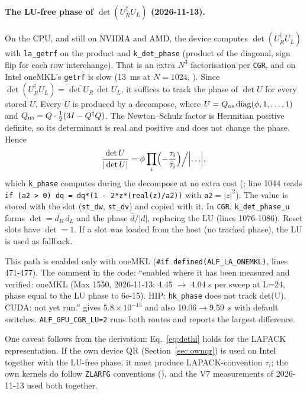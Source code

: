 \paragraph{The LU-free phase of $\det(U_R^\dagger U_L)$ (2026-11-13).} On the CPU, and still on NVIDIA and AMD, the device computes $\det(U_R^\dagger U_L)$ with \texttt{la\_getrf} on the product and \texttt{k\_det\_phase} (product of the diagonal, sign flip for each row interchange). That is an extra $N^3$ factorisation per \texttt{CGR}, and on Intel oneMKL's \texttt{getrf} is slow (13~ms at $N=1024$, ). %
Since $\det(U_R^\dagger U_L)=\overline{\det U_R}\,\det U_L$, it suffices to track the phase of $\det U$ for every stored $U$. Every $U$ is produced by a decompose, where $U = Q_{\rm ns}\,\mathrm{diag}(\phi,1,\ldots,1)$ and $Q_{\rm ns}=Q\cdot\tfrac12(3I-Q^\dagger Q)$. The Newton--Schulz factor is Hermitian positive definite, so its determinant is real and positive and does not change the phase. Hence
\begin{equation}
\frac{\det U}{|\det U|} = \phi\prod_i\Bigl(-\frac{\tau_i}{\bar\tau_i}\Bigr)\Big/\Bigl|\ldots\Bigr|,
\end{equation}
which \texttt{k\_phase} computes during the decompose at no extra cost (; line 1044 reads \texttt{if (a2 > 0) dq = dq*(1 - 2*z*(real(z)/a2))} with \texttt{a2}$=|z|^2$). The value is stored with the slot (\texttt{st\_dw}, \texttt{st\_dv}) and copied with it. In \texttt{CGR}, \texttt{k\_det\_phase\_u} forms $\det=\overline{d_R}\,d_L$ and the phase $\bar d/|d|$, replacing the LU (lines 1076-1086). Reset slots have $\det=1$. If a slot was loaded from the host (no tracked phase), the LU is used as fallback.

This path is enabled only with oneMKL (\texttt{\#if defined(ALF\_LA\_ONEMKL)}, lines 471-477). The comment in the code: ``enabled where it has been measured and verified: oneMKL (Max 1550, 2026-11-13: 4.45 $\to$ 4.04 s per sweep at L=24, phase equal to the LU phase to 6e-15). HIP: \texttt{hk\_phase} does not track det(U). CUDA: not yet run.''  gives $5.8\times10^{-15}$ and also 10.06$\to$9.59~s with default switches. %
\texttt{ALF\_GPU\_CGR\_LU=2} runs both routes and reports the largest difference.

One caveat follows from the derivation: Eq.~\eqref{eq:dethi} holds for the LAPACK representation. If the own device QR (Section~\ref{sec:ownqr}) is used on Intel together with the LU-free phase, it must produce LAPACK-convention $\tau_i$; the own kernels do follow \texttt{ZLARFG} conventions (), and the V7 measurements of 2026-11-13 used both together. 

